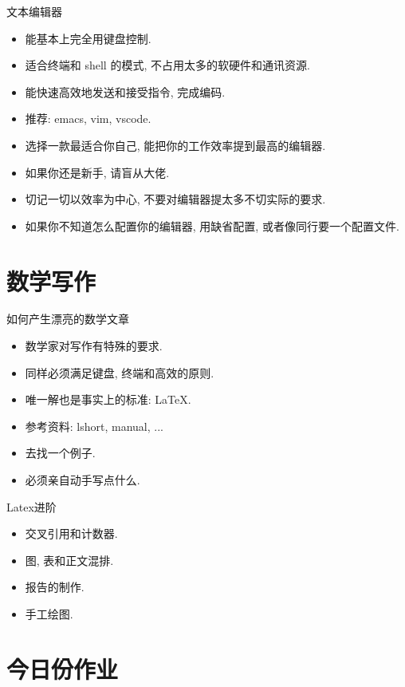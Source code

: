 \documentclass{beamer}
\begin{document}
\begin{frame}{文本编辑器}
  \begin{itemize}
  \item<1-> 能基本上完全用键盘控制.
  \item<2-> 适合终端和 shell 的模式, 不占用太多的软硬件和通讯资源.
  \item<3-> 能快速高效地发送和接受指令, 完成编码.
  \item<4-> 推荐: emacs, vim, vscode.
  \item<5-> 选择一款最适合你自己, 能把你的工作效率提到最高的编辑器.
  \item<6-> 如果你还是新手, 请盲从大佬.
  \item<7-> 切记一切以效率为中心, 不要对编辑器提太多不切实际的要求.
  \item<8-> 如果你不知道怎么配置你的编辑器, 用缺省配置, 或者像同行要一个配置文件. 
  \end{itemize}
\end{frame}

\section{数学写作}
\begin{frame}{如何产生漂亮的数学文章}
  \begin{itemize}
  \item<1-> 数学家对写作有特殊的要求.
  \item<2-> 同样必须满足键盘, 终端和高效的原则.
  \item<3-> 唯一解也是事实上的标准: \LaTeX.
  \item<4-> 参考资料: lshort, manual, ...
  \item<5-> 去找一个例子.
  \item<6-> 必须亲自动手写点什么. 
  \end{itemize}
\end{frame}

\begin{frame}{Latex进阶}
  \begin{itemize}
  \item<1-> 交叉引用和计数器.
  \item<2-> 图, 表和正文混排.
  \item<3-> 报告的制作.
  \item<4-> 手工绘图.
  \end{itemize}
\end{frame}

\section{今日份作业}
\end{document}
